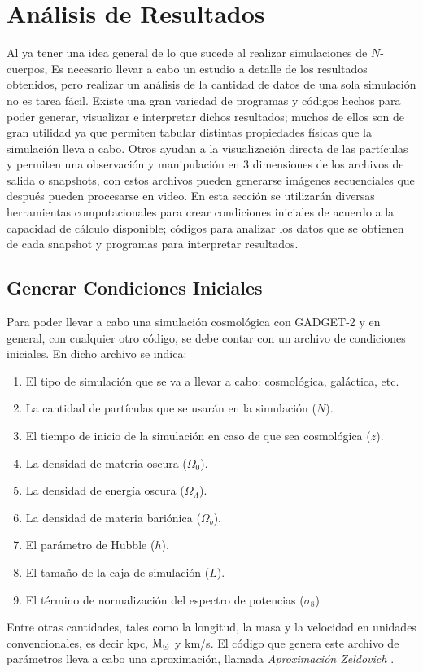 \documentclass[a4paper,openright,12pt]{book}
\begin{document}
\chapter{Análisis de Resultados}
Al ya tener una idea general de lo que sucede al realizar simulaciones de $N$-cuerpos, Es necesario llevar a cabo un estudio a detalle de los resultados obtenidos, pero realizar un análisis de la cantidad de datos de una sola simulación no es tarea fácil. Existe una gran variedad de programas y códigos hechos para poder generar, visualizar e interpretar dichos resultados; muchos de ellos son de gran utilidad ya que permiten tabular distintas propiedades físicas que la simulación lleva a cabo. Otros ayudan a la visualización directa de las partículas y permiten una observación  y manipulación en 3 dimensiones de los archivos de salida o \textsf{snapshots}, con estos archivos pueden generarse imágenes secuenciales que después pueden procesarse en video. En esta sección se utilizarán diversas herramientas computacionales para crear condiciones iniciales de acuerdo a la capacidad de cálculo disponible; códigos para analizar los datos que se obtienen de cada \textsf{snapshot} y programas para interpretar resultados.

\section{Generar Condiciones Iniciales}
Para poder llevar a cabo una simulación cosmológica con GADGET-2 y en general, con cualquier otro código, se debe contar con un archivo de condiciones iniciales. En dicho archivo se indica:
\begin{enumerate}
\item El tipo de simulación que se va a llevar a cabo: cosmológica, galáctica, etc.
\item La cantidad de partículas que se usarán en la simulación ($N$).
\item El tiempo de inicio de la simulación en caso de que sea cosmológica ($z$).
\item La densidad de materia oscura ($\Omega_{0}$).
\item La densidad de energía oscura ($\Omega_{\Lambda}$).
\item La densidad de materia bariónica ($\Omega_{b}$).
\item El parámetro de Hubble ($h$).
\item El tamaño de la caja de simulación ($L$).
\item El término de normalización del espectro de potencias ($\sigma_{8}$) \cite{4.0}.
\end{enumerate}
Entre otras cantidades, tales como la longitud, la masa y la velocidad en unidades convencionales, es decir kpc, $\textup M_{\odot}$ y km/s. El código que genera este archivo de parámetros lleva a cabo una aproximación, llamada \textit{Aproximación Zeldovich} \cite{4.1, 4.2}. 
\end{document}
